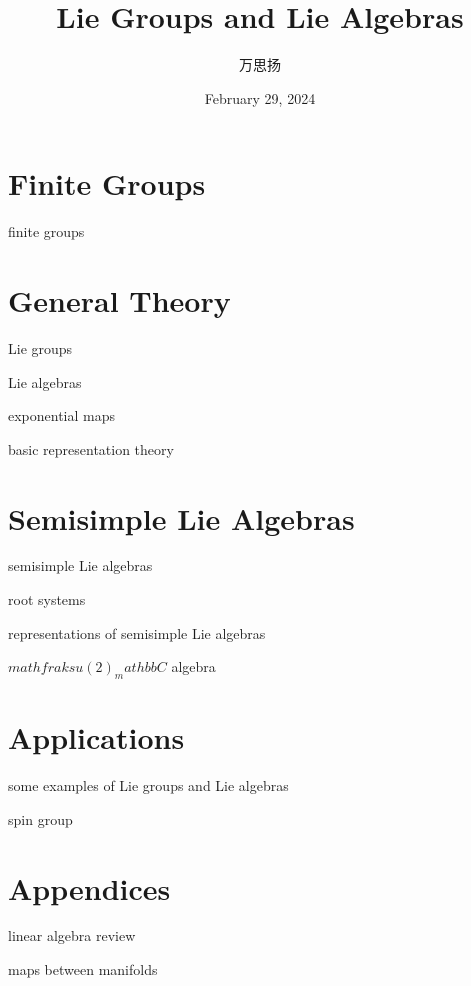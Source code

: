 \documentclass[10pt, a4paper]{report}
\title{\Huge \textbf{Lie Groups and Lie Algebras}}
\author{万思扬}
\date{February 29, 2024}
\numberwithin{equation}{section}
\begin{document}
	\maketitle
	
	\tableofcontents
	
	\part{Finite Groups}
	
	{finite groups}
	
	\part{General Theory}
	
	{Lie groups}
	
	{Lie algebras}
	
	{exponential maps}
	
	{basic representation theory}
	
	\part{Semisimple Lie Algebras}
	
	{semisimple Lie algebras}
	
	{root systems}
	
	{representations of semisimple Lie algebras}
	
	{$mathfrak{su}(2)_mathbb{C}$ algebra}
	
	\part{Applications}
	
	{some examples of Lie groups and Lie algebras}
	
	{spin group}
	
	\appendix
	
	\part*{Appendices}
	
	{linear algebra review}
	
	{maps between manifolds}
\end{document}
